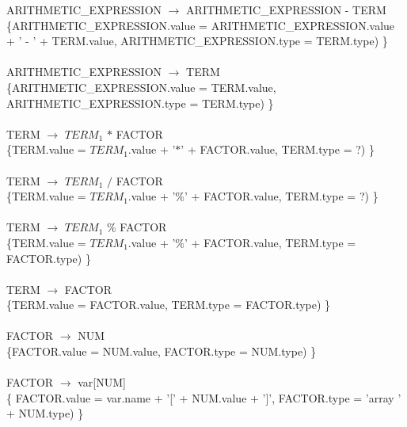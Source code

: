 \documentclass[10pt,a4paper]{article}
\begin{document}
{{{ARITHMETIC\_EXPRESSION $\rightarrow$ ARITHMETIC\_EXPRESSION - TERM  \\

\{ARITHMETIC\_EXPRESSION.value =  ARITHMETIC\_EXPRESSION.value + ' - ' + TERM.value, ARITHMETIC\_EXPRESSION.type = TERM.type) \}  \\ \\


ARITHMETIC\_EXPRESSION $\rightarrow$ TERM \\

\{ARITHMETIC\_EXPRESSION.value = TERM.value, ARITHMETIC\_EXPRESSION.type = TERM.type) \}  \\ \\


TERM $\rightarrow$ $TERM_{1}$ $*$ FACTOR   \\

\{TERM.value = $TERM_{1}$.value + '$*$' + FACTOR.value, TERM.type = ?) \}  \\ \\


TERM $\rightarrow$ $TERM_{1}$ $/$ FACTOR   \\

\{TERM.value = $TERM_{1}$.value + '\%' + FACTOR.value, TERM.type = ?) \}  \\ \\


TERM $\rightarrow$ $TERM_{1}$ \% FACTOR  \\

\{TERM.value = $TERM_{1}$.value + '\%' + FACTOR.value, TERM.type = FACTOR.type) \}  \\ \\


TERM $\rightarrow$ FACTOR \\

\{TERM.value = FACTOR.value, TERM.type = FACTOR.type) \}  \\ \\


FACTOR $\rightarrow$ NUM   \\

\{FACTOR.value = NUM.value, FACTOR.type = NUM.type) \}  \\ \\


FACTOR $\rightarrow$ var[NUM]  \\ 

\{ FACTOR.value = var.name + '[' + NUM.value + ']', FACTOR.type = 'array ' + NUM.type) \}  \\ 
\\

}}}
\end{document}
